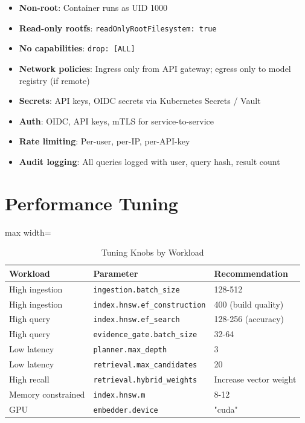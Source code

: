 \begin{itemize}
  \item \textbf{Non-root}: Container runs as UID 1000
  \item \textbf{Read-only rootfs}: \texttt{readOnlyRootFilesystem: true}
  \item \textbf{No capabilities}: \texttt{drop: [ALL]}
  \item \textbf{Network policies}: Ingress only from API gateway; egress only to model registry (if remote)
  \item \textbf{Secrets}: API keys, OIDC secrets via Kubernetes Secrets / Vault
  \item \textbf{Auth}: OIDC, API keys, mTLS for service-to-service
  \item \textbf{Rate limiting}: Per-user, per-IP, per-API-key
  \item \textbf{Audit logging}: All queries logged with user, query hash, result count
\end{itemize}

\section{Performance Tuning}
\label{sec:deploy:tuning}

\begin{table}[htbp]
\centering
\caption{Tuning Knobs by Workload}
\label{tab:deploy:tuning}
\begin{adjustbox}{max width=\textwidth}
\begin{tabular}{lll}
\toprule
\textbf{Workload} & \textbf{Parameter} & \textbf{Recommendation} \\
\midrule
High ingestion & \texttt{ingestion.batch\_size} & 128-512 \\
High ingestion & \texttt{index.hnsw.ef\_construction} & 400 (build quality) \\
High query & \texttt{index.hnsw.ef\_search} & 128-256 (accuracy) \\
High query & \texttt{evidence\_gate.batch\_size} & 32-64 \\
Low latency & \texttt{planner.max\_depth} & 3 \\
Low latency & \texttt{retrieval.max\_candidates} & 20 \\
High recall & \texttt{retrieval.hybrid\_weights} & Increase vector weight \\
Memory constrained & \texttt{index.hnsw.m} & 8-12 \\
GPU & \texttt{embedder.device} & "cuda" \\
\bottomrule
\end{tabular}
\end{adjustbox}
\end{table}


